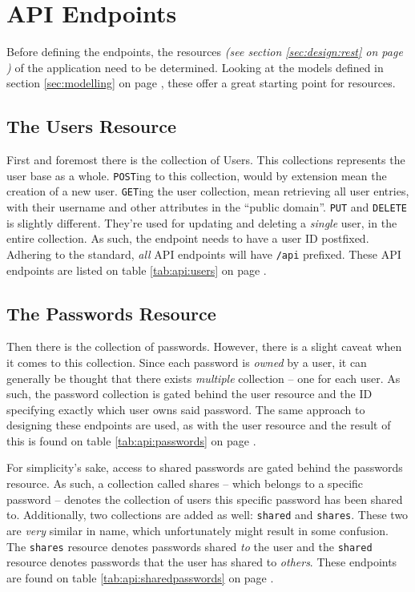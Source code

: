 	\section{API Endpoints}
		\label{sec:api}
		Before defining the endpoints, the resources \emph{(see section \ref{sec:design:rest} on page \pageref{sec:design:rest})} of the application need to be determined. Looking at the models defined in section \ref{sec:modelling} on page \pageref{sec:modelling}, these offer a great starting point for resources.


		\subsection{The Users Resource}
			First and foremost there is the collection of Users. This collections represents the user base as a whole. \verb=POST=ing to this collection, would by extension mean the creation of a new user. \verb=GET=ing the user collection, mean retrieving all user entries, with their username and other attributes in the ``public domain''. \verb=PUT= and \verb=DELETE= is slightly different. They're used for updating and deleting a \emph{single} user, in the entire collection. As such, the endpoint needs to have a user ID postfixed. Adhering to the standard, \emph{all} API endpoints will have \verb=/api= prefixed. These API endpoints are listed on table \ref{tab:api:users} on page \pageref{tab:api:users}.

		\subsection{The Passwords Resource}
			Then there is the collection of passwords. However, there is a slight caveat when it comes to this collection. Since each password is \emph{owned} by a user, it can generally be thought that there exists \emph{multiple} collection -- one for each user. As such, the password collection is gated behind the user resource and the ID specifying exactly which user owns said password. The same approach to designing these endpoints are used, as with the user resource and the result of this is found on table \ref{tab:api:passwords} on page \pageref{tab:api:passwords}.

			For simplicity's sake, access to shared passwords are gated behind the passwords resource. As such, a collection called shares -- which belongs to a specific password -- denotes the collection of users this specific password has been shared to. Additionally, two collections are added as well: \verb=shared= and \verb=shares=. These two are  \emph{very} similar in name, which unfortunately might result in some confusion. The \verb=shares= resource denotes passwords shared \emph{to} the user and the \verb=shared= resource denotes passwords that the user has shared to \emph{others}. These endpoints are found on table \ref{tab:api:sharedpasswords} on page \pageref{tab:api:sharedpasswords}.

